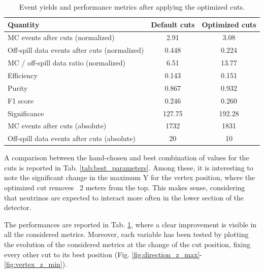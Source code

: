 \begin{table}[htbp]
    \centering
    \begin{tabular}{lcc}
        \hline
        Quantity & Default cuts & Optimized cuts \\
        \hline
        MC events after cuts (normalized)                  & 2.91   & 3.08   \\
        Off-spill data events after cuts (normalized)      & 0.448  & 0.224  \\
        MC / off-spill data ratio (normalized)             & 6.51   & 13.77  \\
        Efficiency                                         & 0.143  & 0.151  \\
        Purity                                             & 0.867  & 0.932  \\
        F1 score                                           & 0.246  & 0.260  \\
        Significance                                       & 127.75 & 192.28 \\
        MC events after cuts (absolute)                    & 1732   & 1831   \\
        Off-spill data events after cuts (absolute)        & 20     & 10     \\
        \hline
    \end{tabular}
    \caption{Event yields and performance metrics after applying the optimized cuts.}
    \label{tab:results_summary}
\end{table}



A comparison between the hand-chosen and best combination of values for the cuts is reported in Tab. \ref{tab:best_parameters}. Among these, it is interesting to note the significant change in the maximum Y for the vertex position, where the optimized cut removes ~2 meters from the top. This makes sense, considering that neutrinos are expected to interact more often in the lower section of the detector.

The performances are reported in Tab. \ref{tab:results_summary}, where a clear improvement is visible in all the considered metrics. Moreover, each variable has been tested by plotting the evolution of the considered metrics at the change of the cut position, fixing every other cut to its best position (Fig. \ref{fig:direction_z_max}-\ref{fig:vertex_z_min}). 




